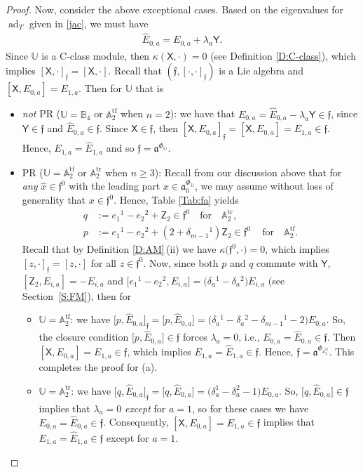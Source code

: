 \documentclass[pdftex]{sigma}%
\DeclareMathOperator{\tf}{tf}
\DeclareMathOperator{\tr}{tr}
\newcommand\ad{\operatorname{ad}}
\newcommand\fa{\mathfrak{a}}
\newcommand\ff{\mathfrak{f}}
\newcommand\bbU{\mathbb{U}}
\newcommand\bbA{\mathbb{A}}
\newcommand\bbB{\mathbb{B}}
\newcommand\sfX{\mathsf{X}}
\newcommand\sfY{\mathsf{Y}}
\newcommand\sfZ{\mathsf{Z}}
\numberwithin{equation}{section}
\begin{document}
\begin{proof}
 Now, consider the above exceptional cases. Based on the eigenvalues for $\ad_T$ given in \eqref{jac}, we must have
 \begin{align*}
 \widehat{E}_{0,a} = E_{0,a} + \lambda_a\sfY.
 \end{align*}
 Since $\bbU$ is a C-class module, then $\kappa(\sfX, \cdot) = 0$ (see Definition \ref{D:C-class}), which implies $[\sfX, \cdot]_\ff = [\sfX, \cdot]$. Recall that $(\ff, [\cdot, \cdot]_\ff)$ is a Lie algebra and $[\sfX, E_{0,a}] = E_{1,a}$. Then for $\bbU$ that is
\begin{itemize}\itemsep=0pt
\item[(a)] {\em not} PR \big($\bbU = \bbB_4$ or $\bbA_2^{\tf}$ when $n=2$\big): we have that $E_{0,a} = \widehat{E}_{0,a}- \lambda_a\sfY \in \ff$, since $\sfY \in \ff$ and $\widehat{E}_{0,a} \in \ff$. Since $\sfX \in \ff$, then $[\sfX, E_{0,a}]_\ff = [\sfX, E_{0,a}] = E_{1,a} \in \ff$. Hence, $E_{1,a} = \widehat{E}_{1,a}$ and so $\ff = \fa^{\Phi_{\bbU}}$.
\item [(b)] PR \big($\bbU =\bbA_2^{\tf}$ or $\bbA_2^{\tr}$ when $n\ge 3$\big): Recall from our discussion above that for {\em any} $\widehat{x} \in \ff^0$ with the leading part $x \in \fa^{\Phi_\bbU}_0$, we may assume without loss of generality that $x \in \ff^0$. Hence, Table \ref{Tab:fa} yields
 \begin{align*} %
 q &:= e_1{}^1 - e_2{}^2 + \sfZ_2 \in \ff^0 \quad \text{for} \quad \bbA_2^{\tr},\\
 p &:= e_1{}^1 - e_2{}^2 + (2 + \delta_{m-1}{}^1)\sfZ_2 \in \ff^0\, \quad \text{for} \quad \bbA_2^{\tf}.
 \end{align*}
Recall that by Definition \ref{D:AM}\,(ii) we have $\kappa\bigl(\ff^0,\cdot\bigr) = 0$, which implies $[z, \cdot]_\ff = [z,\cdot]$ for all $z \in \ff^0$. Now, since both $p$ and $q$ commute with $\sfY$, $[\sfZ_2, E_{i,a}] = -E_{i,a}$ and $\big[e_1{}^1 - e_2{}^2, E_{i,a}\big] = \bigl(\delta_a{}^1-\delta_a{}^2\bigr) E_{i,a}$ (see Section~\ref{S:FM}), then for
\begin{itemize}\itemsep=0pt
\item[(i)] $\bbU = \bbA_2^{\tf}$: we have $\big[p,\widehat{E}_{0,a}\big]_\ff = \big[p,\widehat{E}_{0,a}\big] = \bigl(\delta_a{}^1-\delta_a{}^2 - \delta_{m-1}{}^1-2\bigr)E_{0,a}$. So, the closure condition $\big[p,\widehat{E}_{0,a}\big] \in \ff$ forces $\lambda_a = 0$, i.e., $E_{0,a} = \widehat{E}_{0,a} \in \ff$. Then $[\sfX, E_{0,a} ]= E_{1,a} \in \ff$, which implies $E_{1,a} =\widehat{E}_{1,a} \in \ff$. Hence, $\ff = \fa^{\Phi_{\bbA_2^{\tf}}}$. This completes the proof for (a).
\item [(ii)] $\bbU = \bbA_2^{\tr}$: we have $\big[q, \widehat{E}_{0,a}\big]_\ff = \big[q, \widehat{E}_{0,a}\big] = \bigl(\delta^1_a - \delta^2_a - 1\bigr) E_{0,a}$. So, $\big[q, \widehat{E}_{0,a}\big] \in \ff$ implies that $\lambda_a = 0$ {\em except} for $a=1$, so for these cases we have $E_{0,a} = \widehat{E}_{0,a} \in \ff$. Consequently, $[\sfX, E_{0,a}] = E_{1,a} \in \ff$ implies that $E_{1,a} = \widehat{E}_{1,a} \in \ff$ except for $a=1$.


\end{itemize}
\end{itemize}
\end{proof}
\end{document}

